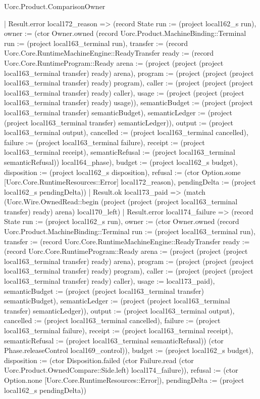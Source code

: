 \begin{lexlean}{Uorc.Product.ComparisonOwner}
\begin{semanticmodule}
{      | Result.error local172_reason => (record State {run := (project local162_s run), owner := (ctor Owner.owned (record Uorc.Product.MachineBinding::Terminal {run := (project local163_terminal run), transfer := (record Uorc.Core.RuntimeMachineEngine::ReadyTransfer {ready := (record Uorc.Core.RuntimeProgram::Ready {arena := (project (project (project local163_terminal transfer) ready) arena), program := (project (project (project local163_terminal transfer) ready) program), caller := (project (project (project local163_terminal transfer) ready) caller), usage := (project (project (project local163_terminal transfer) ready) usage)}), semanticBudget := (project (project local163_terminal transfer) semanticBudget), semanticLedger := (project (project local163_terminal transfer) semanticLedger)}), output := (project local163_terminal output), cancelled := (project local163_terminal cancelled), failure := (project local163_terminal failure), receipt := (project local163_terminal receipt), semanticRefusal := (project local163_terminal semanticRefusal)}) local164_phase), budget := (project local162_s budget), disposition := (project local162_s disposition), refusal := (ctor Option.some [Uorc.Core.RuntimeResources::Error] local172_reason), pendingDelta := (project local162_s pendingDelta)})
      | Result.ok local173_paid => (match (Uorc.Wire.OwnedRead::begin (project (project (project local163_terminal transfer) ready) arena) local170_left)
        | Result.error local174_failure => (record State {run := (project local162_s run), owner := (ctor Owner.owned (record Uorc.Product.MachineBinding::Terminal {run := (project local163_terminal run), transfer := (record Uorc.Core.RuntimeMachineEngine::ReadyTransfer {ready := (record Uorc.Core.RuntimeProgram::Ready {arena := (project (project (project local163_terminal transfer) ready) arena), program := (project (project (project local163_terminal transfer) ready) program), caller := (project (project (project local163_terminal transfer) ready) caller), usage := local173_paid}), semanticBudget := (project (project local163_terminal transfer) semanticBudget), semanticLedger := (project (project local163_terminal transfer) semanticLedger)}), output := (project local163_terminal output), cancelled := (project local163_terminal cancelled), failure := (project local163_terminal failure), receipt := (project local163_terminal receipt), semanticRefusal := (project local163_terminal semanticRefusal)}) (ctor Phase.releaseControl local169_control)), budget := (project local162_s budget), disposition := (ctor Disposition.failed (ctor Failure.read (ctor Uorc.Product.OwnedCompare::Side.left) local174_failure)), refusal := (ctor Option.none [Uorc.Core.RuntimeResources::Error]), pendingDelta := (project local162_s pendingDelta)})
}
\end{semanticmodule}
\end{lexlean}
